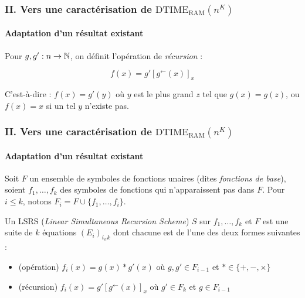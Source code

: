 \documentclass[10pt]{beamer}
\newcommand{\dtimeram}{\text{DTIME}_{\text{RAM}}\left( n^K \right)}
\newcommand{\eqpred}[3]{#1\left[ #2^{\leftarrow}(#3) \right]_{#3}}
\begin{document}
	\begin{frame}
		\frametitle{II. Vers une caractérisation de $\dtimeram$}
		\framesubtitle{Adaptation d'un résultat existant}
		
		\begin{defn}
			Pour $g, g' : n \to \mathbb{N}$, on définit l'opération de \emph{récursion} :
			
			\[
				f(x) = \eqpred{g'}{g}{x}
			\]
			
			C'est-à-dire : $f(x) = g'(y)$ où $y$ est le plus grand $z$ tel que $g(x) = g(z)$, ou $f(x) = x$ si un tel $y$ n'existe pas.
		\end{defn}
	\end{frame}
	
	\begin{frame}
		\frametitle{II. Vers une caractérisation de $\dtimeram$}
		\framesubtitle{Adaptation d'un résultat existant}
				
		\begin{defn}[LSRS]
			\label{def:LSRS}
			Soit $F$ un ensemble de symboles de fonctions unaires (dites \emph{fonctions de base}), soient $f_1, \dots, f_k$ des symboles de fonctions qui n'apparaissent pas dans $F$. Pour $i\leqslant k$, notons $F_i = F\cup \{f_1, \dots, f_i\}$. 
			
			Un LSRS (\emph{Linear Simultaneous Recursion Scheme}) $S$ sur $f_1, \dots, f_k$ et $F$ est une suite de $k$ équations $\left(E_i\right)_{i_\in k}$ dont chacune est de l'une des deux formes suivantes :
			
			\begin{itemize}
				\item 	(opération) 		$f_i(x) = g(x) * g'(x)$ où $g,g' \in F_{i-1}$ et $* \in \{+, -, \times \}$
				
				\item 	(récursion)			$f_i(x) = \eqpred{g'}{g}{x}$ où $g' \in F_k$ et $g \in F_{i-1}$
			\end{itemize}
			
		\end{defn}
	\end{frame}
	
\end{document}
